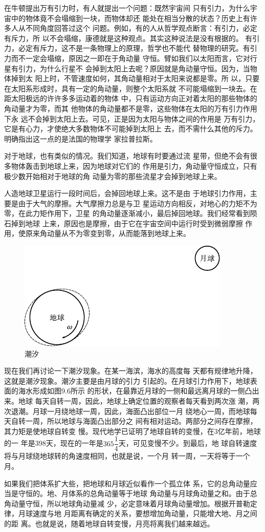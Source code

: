在牛顿提出万有引力时，有人就提出一个问题：既然宇宙间
只有引力，为什么宇宙中的物体竟不会塌缩到一块，而物体却还
能处在相当分散的状态？历史上有许多人从不同角度回答过这个
问题。例如，有的人从哲学观点断言：有引力，必定有斥力，所
以不会塌缩，康德就是这种观点。其实这种说法是没有根据的。
有引力，必定有斥力，这不是一条物理上的原理，哲学也不能代
替物理的研究。有引力而不一定会塌缩，原因之一即在于角动量
守恒。臂如我们以太阳而言，它对行星有引力，为什么行星不
会掉到太阳上去呢？原因就是角动量守恒。因为，当物体掉到太
阳上时，不管速度如何，其角动量相对于太阳来说都是零。所
以，只要在太阳系形成时，具有一定的角动量，则整个太阳系就
不可能塌缩到一块去。在距太阳极远的许许多多运动着的物体
中，只有运动方向正对着太阳的那些物体的角动量才为零，而其
他物体的角动量都不是零，这些物体在太阳的万有引力作用下永
远不会掉到太阳上去。可见，正是因为太阳与物体之间的作用是
万有引力，它是有心力，才使绝大多数物体不可能掉到太阳上
去，而不需什么其他的斥力。明确指出这一点的是法国的物理学
家拉普拉斯。

对于地球，也有类似的情况。我们知道，地球有时要通过流
星带，但绝不会有很多物体轰击到地球上来，因为地球对它们的
作用是引力，角动量守恒成立，只有极少数开始相对于地球的角
动量为零的那些流星才会掉到地球上来。

人造地球卫星运行一段时间后，会掉回地球上来。这不是由
于地球引力作用，主要是由于大气的摩擦。大气摩擦力总是与卫
星运动方向相反，对地心的力矩不为零，在此力矩作用下，卫星
的角动量逐渐减小，最后掉回地球。我们经常看到陨石掉到地球
上来，原因也是摩擦，由于它在宇宙空间中运行时受到微弱摩擦
作用，使原来角动量从不为零变到零，从而能落到地球上来。
\begin{figure}[h]
  \centering
  \includegraphics{figure/fig09.06}
  \caption{潮汐}
  \label{fig:09.06}
\end{figure}

现在我们再讨论一下潮汐现象。在某一海滨，海水的高度每
天都有规律地升降，这就是潮汐现象。潮汐主要是由月球的引力
引起的。在月球引力作用下，地球表面的海水形成如图9.6所示
的形状，在最靠近月球的一侧和最远离月球的一侧凸出来。地球
每天自转一周，因此，地球上确定位置的观察者每天看到两次涨
潮，两次退潮。月球一月绕地球一周，因此，海面凸出部位一月
绕地心一周，而地球每天自转一周，所以地球与海面凸出部分之
间有相对运动。两部分之间存在摩擦，其力矩是使地球自转变
慢。现代地学已证明了地球自转的变慢，在3亿年前，地球的一
年是398天，现在的一年是$ 3 6 5  \dfrac { 1 } { 4 } $天，可见变慢不少。到最后，地
球自转速度将与月球绕地球转的角速度相同，也就是说，一个月
转一周，一天将等于一个月。

如果我们把体系扩大些，把地球和月球近似看作一个孤立体
系，它的总角动量应当是守恒的。地、月体系的总角动量等于地球
角动量与月球角动量之和。由于总角动量守恒，所以地球角动量减
少，必定意味着月球角动量增加。根据开普勒定律，月球速度与地
月距离有确定的关系，要想增加角动量，只能增大地、月之间的距
离。也就是说，随着地球自转变慢，月亮将离我们越来越远。
